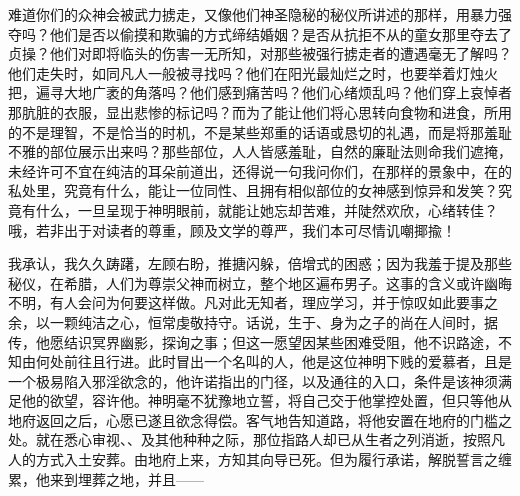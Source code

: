 难道你们的众神会被武力掳走，又像他们神圣隐秘的秘仪所讲述的那样，用暴力强夺吗？他们是否以偷摸和欺骗的方式缔结婚姻？是否从抗拒不从的童女那里夺去了贞操？他们对即将临头的伤害一无所知，对那些被强行掳走者的遭遇毫无了解吗？他们走失时，如同凡人一般被寻找吗？他们在阳光最灿烂之时，也要举着灯烛火把，遍寻大地广袤的角落吗？他们感到痛苦吗？他们心绪烦乱吗？他们穿上哀悼者那肮脏的衣服，显出悲惨的标记吗？而为了能让他们将心思转向食物和进食，所用的不是理智，不是恰当的时机，不是某些郑重的话语或恳切的礼遇，而是将那羞耻不雅的部位展示出来吗？那些部位，人人皆感羞耻，自然的廉耻法则命我们遮掩，未经许可不宜在纯洁的耳朵前道出，还得说一句我问你们，在那样的景象中，在的私处里，究竟有什么，能让一位同性、且拥有相似部位的女神感到惊异和发笑？究竟有什么，一旦呈现于神明眼前，就能让她忘却苦难，并陡然欢欣，心绪转佳？哦，若非出于对读者的尊重，顾及文学的尊严，我们本可尽情讥嘲揶揄！\par

我承认，我久久踌躇，左顾右盼，推搪闪躲，倍增式的困惑；因为我羞于提及那些秘仪，在希腊，人们为尊崇父神而树立，整个地区遍布男子。这事的含义或许幽晦不明，有人会问为何要这样做。凡对此无知者，理应学习，并于惊叹如此要事之余，以一颗纯洁之心，恒常虔敬持守。话说，生于、身为之子的尚在人间时，据传，他愿结识冥界幽影，探询之事；但这一愿望因某些困难受阻，他不识路途，不知由何处前往且行进。此时冒出一个名叫的人，他是这位神明下贱的爱慕者，且是一个极易陷入邪淫欲念的，他许诺指出的门径，以及通往的入口，条件是该神须满足他的欲望，容许他。神明毫不犹豫地立誓，将自己交于他掌控处置，但只等他从地府返回之后，心愿已遂且欲念得偿。客气地告知道路，将他安置在地府的门槛之处。就在悉心审视、、及其他种种之际，那位指路人却已从生者之列消逝，按照凡人的方式入土安葬。由地府上来，方知其向导已死。但为履行承诺，解脱誓言之缠累，他来到埋葬之地，并且——\par

